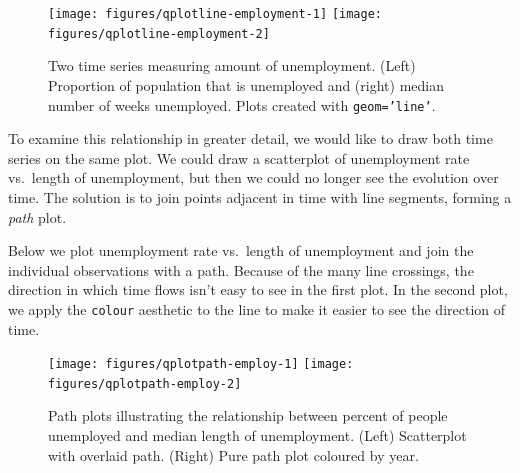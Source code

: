 \begin{figure}

{\centering \texttt{[image: figures/qplotline-employment-1]} \texttt{[image: figures/qplotline-employment-2]} 

}

\caption{Two time series measuring amount of unemployment.  (Left) Proportion of population that is unemployed and (right) median number of weeks unemployed.  Plots created with \texttt{geom='line'}.\label{fig:line-employment}}
\end{figure}

To examine this relationship in greater detail, we would like to draw
both time series on the same plot. We could draw a scatterplot of
unemployment rate vs.~length of unemployment, but then we could no
longer see the evolution over time. The solution is to join points
adjacent in time with line segments, forming a \emph{path} plot.

Below we plot unemployment rate vs.~length of unemployment and join the
individual observations with a path. Because of the many line crossings,
the direction in which time flows isn't easy to see in the first plot.
In the second plot, we apply the \texttt{colour} aesthetic to the line
to make it easier to see the direction of time.

\begin{Shaded}
\begin{Highlighting}[]
\StringTok{ }\StringTok{ }
\StringTok{ } 
    \NormalTok{(}\NormalTok{, }\NormalTok{))}
\StringTok{ } 
   \NormalTok{, } 
\end{Highlighting}
\end{Shaded}

\begin{figure}

{\centering \texttt{[image: figures/qplotpath-employ-1]} \texttt{[image: figures/qplotpath-employ-2]} 

}

\caption{Path plots illustrating the relationship between percent of people unemployed and median length of unemployment.  (Left) Scatterplot with overlaid path.  (Right) Pure path plot coloured by year.\label{fig:path-employ}}
\end{figure}

